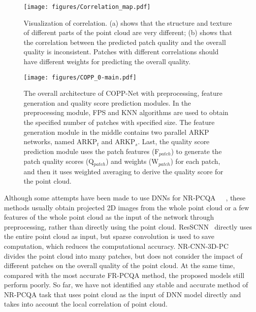 \documentclass[conference]{IEEEtran}
\begin{document}
\begin{figure}[t]             \begin{center}
    \texttt{[image: figures/Correlation\_map.pdf]}
\end{center}
\vspace{-0.1cm}
   \caption{Visualization of correlation. (a) shows that the structure and texture of different parts of the point cloud are very different; (b) shows that the correlation between the predicted patch quality and the overall quality is inconsistent. Patches with different correlations should have different weights for predicting the overall quality.}
\label{fig:correlation}
\end{figure}



\begin{figure*}[t]       \begin{center}
    \texttt{[image: figures/COPP\_0-main.pdf]}
\end{center}
\vspace{-0.3cm}
   \caption{The overall architecture of COPP-Net with preprocessing, feature generation and quality score prediction modules. In the preprocessing module, FPS and KNN algorithms are used to obtain the specified number of patches with specified size. The feature generation module in the middle contains two parallel ARKP networks, named ARKP$_{t}$ and ARKP$_{s}$. Last, the quality score prediction module uses the patch features (F$_{patch}$) to generate the patch quality scores (Q$_{patch}$) and weights (W$_{patch}$) for each patch, and then it uses weighted averaging to derive the quality score for the point cloud.}
\label{fig:model structure}
\end{figure*}







Although some attempts have been made to use DNNs for NR-PCQA~\cite{liu2021pqa}~\cite{zhang2022no}~\cite{yang2022no}, these methods usually obtain projected 2D images from the whole point cloud or a few features of the whole point cloud as the input of the network through preprocessing, rather than directly using the point cloud. ResSCNN~\cite{liu2022point} directly uses the entire point cloud as input, but sparse convolution is used to save computation, which reduces the computational accuracy. NR-CNN-3D-PC~\cite{chetouani2021deep} divides the point cloud into many patches, but does not consider the impact of different patches on the overall quality of the point cloud. At the same time, compared with the most accurate FR-PCQA method, the proposed models still perform poorly. 
So far, we have not identified any stable and accurate method of NR-PCQA task that uses point cloud as the input of DNN model directly and takes into account the local correlation of point cloud.
\end{document}

